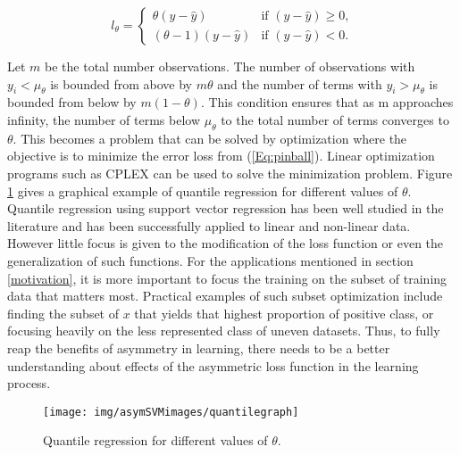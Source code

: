 \documentclass[twoside,11pt]{article}
\begin{document}
\begin{equation}\label{Eq:pinball}
l_{\theta}=
\begin{cases} \theta (y-\hat{y}) & \text{if $(y-\hat{y})\geq 0$,}
\\
 (\theta - 1) (y-\hat{y})  &\text{if $(y-\hat{y})< 0$.}
\end{cases}
\end{equation}

Let $m$ be the total number observations. The number of observations with $y_i < \mu_{\theta}$ is bounded from above by $m\theta$ and the number of terms with $y_i > \mu_{\theta}$ is bounded from below by $m(1-\theta)$. This condition ensures that as m approaches infinity, the number of terms below $\mu_{\theta}$ to the total number of terms converges to $\theta$. This becomes a problem that can be solved by optimization where the objective is to minimize the error loss from (\ref{Eq:pinball}). Linear optimization programs such as CPLEX can be used to solve the minimization problem. Figure \ref{Fig:Quantile Regression} gives a graphical example of quantile regression for different values of $\theta$. Quantile regression using support vector regression has been well studied in the literature \citep{Changha05} and has been successfully applied to linear and non-linear data. However little focus is given to the modification of the loss function or even the generalization of such functions. For the applications mentioned in section \ref{motivation}, it is more important to focus the training on the subset of training data that matters most. Practical examples of such subset optimization include finding the subset of $x$ that yields that highest proportion of positive class, or focusing heavily on the less represented class of uneven datasets. Thus, to fully reap the benefits of asymmetry in learning, there needs to be a better understanding about effects of the asymmetric loss function in the learning process.
\begin{figure}
 \centering
\texttt{[image: img/asymSVMimages/quantilegraph]}\\
 \caption{Quantile regression for different values of $\theta$.}
 \label{Fig:Quantile Regression}
\end{figure}
\end{document}
